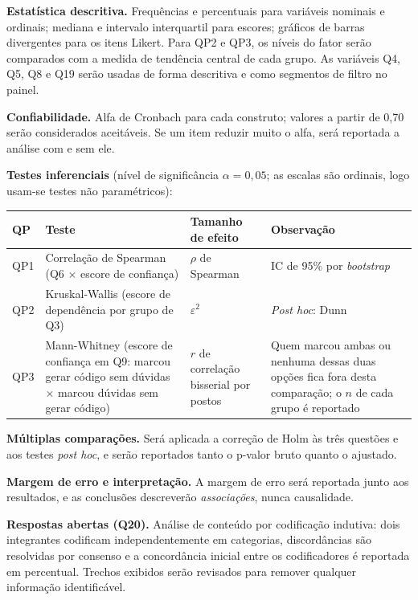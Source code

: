 \documentclass[11pt,a4paper]{article}
\begin{document}
\textbf{Estatística descritiva.} Frequências e percentuais para variáveis nominais e ordinais; mediana e intervalo interquartil para escores; gráficos de barras divergentes para os itens Likert. Para QP2 e QP3, os níveis do fator serão comparados com a medida de tendência central de cada grupo. As variáveis Q4, Q5, Q8 e Q19 serão usadas de forma descritiva e como segmentos de filtro no painel.

\textbf{Confiabilidade.} Alfa de Cronbach para cada construto; valores a partir de 0,70 serão considerados aceitáveis. Se um item reduzir muito o alfa, será reportada a análise com e sem ele.

\textbf{Testes inferenciais} (nível de significância $\alpha = 0{,}05$; as escalas são ordinais, logo usam-se testes não paramétricos):
\begin{center}
\small
\begin{tabularx}{\textwidth}{@{}l X X X@{}}
\toprule
\textbf{QP} & \textbf{Teste} & \textbf{Tamanho de efeito} & \textbf{Observação} \\
\midrule
QP1 & Correlação de Spearman (Q6 $\times$ escore de confiança) & $\rho$ de Spearman & IC de 95\% por \emph{bootstrap} \\
QP2 & Kruskal-Wallis (escore de dependência por grupo de Q3) & $\varepsilon^2$ & \emph{Post hoc}: Dunn \\
QP3 & Mann-Whitney (escore de confiança em Q9: marcou gerar código sem dúvidas $\times$ marcou dúvidas sem gerar código) & $r$ de correlação bisserial por postos & Quem marcou ambas ou nenhuma dessas duas opções fica fora desta comparação; o $n$ de cada grupo é reportado \\
\bottomrule
\end{tabularx}
\end{center}

\textbf{Múltiplas comparações.} Será aplicada a correção de Holm às três questões e aos testes \emph{post hoc}, e serão reportados tanto o p-valor bruto quanto o ajustado.

\textbf{Margem de erro e interpretação.} A margem de erro será reportada junto aos resultados, e as conclusões descreverão \emph{associações}, nunca causalidade.

\textbf{Respostas abertas (Q20).} Análise de conteúdo por codificação indutiva: dois integrantes codificam independentemente em categorias, discordâncias são resolvidas por consenso e a concordância inicial entre os codificadores é reportada em percentual. Trechos exibidos serão revisados para remover qualquer informação identificável.
\end{document}
